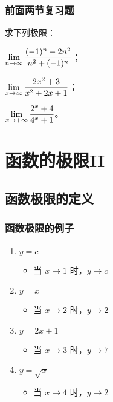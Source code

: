 \documentclass[14pt,notheorems,leqno,xcolor={rgb}]{beamer} %
\begin{document}
\begin{frame}
\frametitle{前面两节复习题}
\begin{review}
求下列极限：
\begin{enumlite}
  \item $\lim\limits_{n\to\infty}\dfrac{(-1)^n-2n^2}{n^2+(-1)^n}$；
  \item $\lim\limits_{x\to\infty}\dfrac{2x^2+3}{x^2+2x+1}$；\pause
  \item $\lim\limits_{x\to+\infty}\dfrac{2^x+4}{4^x+1}$。
\end{enumlite}
\end{review}
\end{frame}

\section{函数的极限II}

\subsection{函数极限的定义}

\begin{oframe}
\frametitle{函数极限的例子}
\begin{enumerate}[<+->]
  \item $y=c$
  \begin{itemize}
    \item 当 $x\to 1$ 时，$y\to c$
  \end{itemize}
  \item $y=x$
  \begin{itemize}
    \item 当 $x\to 2$ 时，$y\to 2$
  \end{itemize}
  \item $y=2x+1$
  \begin{itemize}
    \item 当 $x\to 3$ 时，$y\to 7$
  \end{itemize}
  \item $y=\sqrt{x}$
  \begin{itemize}
    \item 当 $x\to 4$ 时，$y\to 2$
  \end{itemize}
\end{enumerate}
\end{oframe}
\end{document}
